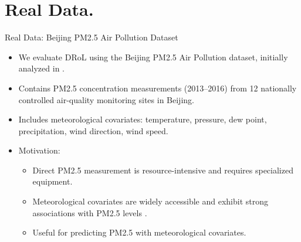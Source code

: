 \documentclass{beamer}
\begin{document}
\section{Real Data.}

\begin{frame}{Real Data: Beijing PM2.5 Air Pollution Dataset}
    \begin{itemize}
        \item We evaluate DRoL using the Beijing PM2.5 Air Pollution dataset, initially analyzed in \cite{69}.
        \item Contains PM2.5 concentration measurements (2013–2016) from 12 nationally controlled air-quality monitoring sites in Beijing.
        \item Includes meteorological covariates: temperature, pressure, dew point, precipitation, wind direction, wind speed.
        \item Motivation:
        \begin{itemize}
            \item Direct PM2.5 measurement is resource-intensive and requires specialized equipment.
            \item Meteorological covariates are widely accessible and exhibit strong associations with PM2.5 levels \cite{57,69,67,13}.
            \item Useful for predicting PM2.5 with meteorological covariates.
        \end{itemize}
    \end{itemize}
\end{frame}
\end{document}
